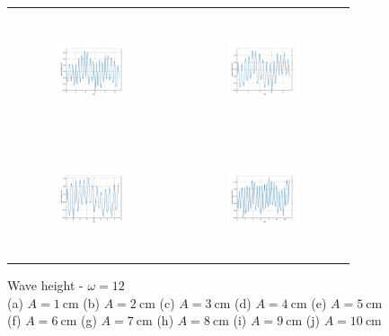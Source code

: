 \begin{figure}[H]
\begin{center}
\begin{tabular}{cc}
\includegraphics[width=0.45\textwidth, height=3.5cm]{graph/omega=3.50_A=7_wave.pdf}
&
\includegraphics[width=0.45\textwidth, height=3.5cm]{graph/omega=3.50_A=8_wave.pdf}\\
\includegraphics[width=0.45\textwidth, height=3.5cm]{graph/omega=3.50_A=9_wave.pdf}
&
\includegraphics[width=0.45\textwidth, height=3.5cm]{graph/omega=3.50_A=10_wave.pdf}\\
\end{tabular}
\end{center}
\caption{Wave height - $\omega=12$ \\ (a) $A=1\mathrm{~cm}$ (b) $A=2\mathrm{~cm}$ (c) $A=3\mathrm{~cm}$ (d) $A=4\mathrm{~cm}$ (e) $A=5\mathrm{~cm}$\\(f) $A=6\mathrm{~cm}$ (g) $A=7\mathrm{~cm}$ (h) $A=8\mathrm{~cm}$ (i) $A=9\mathrm{~cm}$ (j) $A=10\mathrm{~cm}$}
\label{Data_omega=12_wave}
\end{figure}